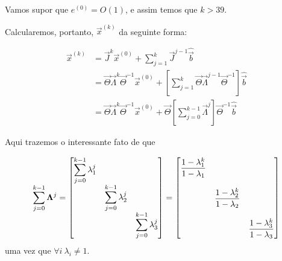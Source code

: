 \documentclass{homework}
\begin{document}
\begin{enumerate}[wide, leftmargin=80pt]
			Vamos supor que $e^{(0)} = O(1)$, e assim temos que $k > 39$.\par
			
			Calcularemos, portanto, $\vec{x}^{(k)}$ da seguinte forma:
			
			\begin{align*}
				\vec{x}^{(k)} &= \vec{J}^{k} \vec{x}^{(0)} + \sum_{j=1}^{k} \vec{J}^{j-1}\hat{\vec{b}}\\
							  &= \vec{\Theta}\vec{\Lambda}^k\vec{\Theta}^{-1} \vec{x}^{(0)} + \left[\sum_{j=1}^{k} \vec{\Theta}\vec{\Lambda}^{j-1}\vec{\Theta}^{-1}\right] \hat{\vec{b}}\\
							  &= \vec{\Theta}\vec{\Lambda}^k\vec{\Theta}^{-1} \vec{x}^{(0)} +  \vec{\Theta}\left[\sum_{j=0}^{k-1}\vec{\Lambda}^{j}\right]\vec{\Theta}^{-1} \hat{\vec{b}}
			\end{align*}
			
			Aqui trazemos o interessante fato de que
			
			\begin{align*}
				\sum_{j=0}^{k-1}\vec{\Lambda}^{j} = \left[
				\begin{array}{@{}ccc@{}}
				\displaystyle\sum_{j=0}^{k-1} \lambda_1^{j} & ~ & ~ \\[2ex]
				 ~ & \displaystyle\sum_{j=0}^{k-1} \lambda_2^{j}& ~ \\[2ex]
				~ & ~ & \displaystyle\sum_{j=0}^{k-1} \lambda_3^{j}
				\end{array}
				\right] = \left[
				\begin{array}{@{}ccc@{}}
				\displaystyle\frac{1 - \lambda_1^k}{1 - \lambda_1} & ~ & ~ \\[4ex]
				~ & \displaystyle\frac{1 - \lambda_2^k}{1 - \lambda_2} & ~ \\[4ex]
				~ & ~ & \displaystyle\frac{1 - \lambda_3^k}{1 - \lambda_3}
				\end{array}
				\right]
			\end{align*}
			uma vez que $\forall i ~ \lambda_i \neq 1$.\par
			

\end{enumerate}
\end{document}
